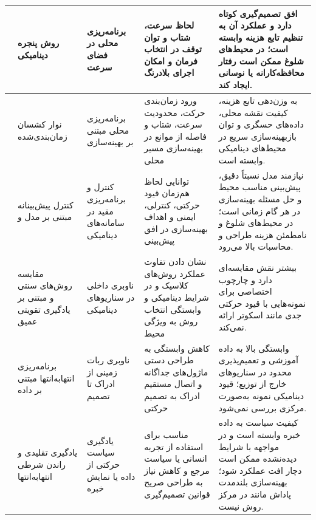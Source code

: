 \begin{longtable}{|C{2.35cm}|P{2.35cm}|P{2.65cm}|P{3.45cm}|P{3.95cm}|}
	\cite{fox1997dwa} &
	روش پنجره دینامیکی  &
	برنامه‌ریزی محلی در فضای سرعت &
	لحاظ سرعت، شتاب و توان توقف در انتخاب فرمان و امکان اجرای بلادرنگ &
	افق تصمیم‌گیری کوتاه دارد و عملکرد آن به تنظیم تابع هزینه وابسته است؛ در محیط‌های شلوغ ممکن است رفتار محافظه‌کارانه یا نوسانی ایجاد کند. \\
	\hline
	
	\cite{Quinlan1993ElasticBands,Rosmann2013TEB,Rosmann2015TEB} &
	نوار کشسان زمان‌بندی‌شده  &
	برنامه‌ریزی محلی مبتنی بر بهینه‌سازی &
	ورود زمان‌بندی حرکت، محدودیت سرعت، شتاب و فاصله از موانع در بهینه‌سازی مسیر محلی &
	به وزن‌دهی تابع هزینه، کیفیت نقشه محلی، داده‌های حسگری و توان بازبهینه‌سازی سریع در محیط‌های دینامیکی وابسته است. \\
	\hline
	
	\cite{rawlings2009mpc,Bemporad1999,Mayne2005TubeMPC} &
	کنترل پیش‌بینانه مبتنی بر مدل  و  &
	کنترل و برنامه‌ریزی مقید در سامانه‌های دینامیکی &
	توانایی لحاظ هم‌زمان قیود حرکتی، کنترلی، ایمنی و اهداف بهینه‌سازی در افق پیش‌بینی &
	نیازمند مدل نسبتاً دقیق، پیش‌بینی مناسب محیط و حل مسئله بهینه‌سازی در هر گام زمانی است؛ در محیط‌های شلوغ و نامطمئن هزینه طراحی و محاسبات بالا می‌رود. \\
	\hline
	
	\cite{s23249672} &
	مقایسه روش‌های سنتی و مبتنی بر یادگیری تقویتی عمیق &
	ناوبری داخلی در سناریوهای دینامیکی &
	نشان دادن تفاوت عملکرد روش‌های کلاسیک و  در شرایط دینامیکی و وابستگی انتخاب روش به ویژگی محیط &
	بیشتر نقش مقایسه‌ای دارد و چارچوب اختصاصی برای نمونه‌هایی با قیود حرکتی جدی مانند اسکوتر ارائه نمی‌کند. \\
	\hline
	
	\cite{pfeiffer2018nav} &
	برنامه‌ریزی انتهابه‌انتها مبتنی بر داده &
	ناوبری ربات زمینی از ادراک تا تصمیم &
	کاهش وابستگی به طراحی دستی ماژول‌های جداگانه و اتصال مستقیم ادراک به تصمیم حرکتی &
	وابستگی بالا به داده آموزشی و تعمیم‌پذیری محدود در سناریوهای خارج از توزیع؛ قیود دینامیکی نمونه به‌صورت مرکزی بررسی نمی‌شود. \\
	\hline
	
	\cite{argall2009survey,codevilla2018endtoend} &
	یادگیری تقلیدی و راندن شرطی انتهابه‌انتها &
	یادگیری سیاست حرکتی از داده یا نمایش خبره &
	مناسب برای استفاده از تجربه انسانی یا سیاست مرجع و کاهش نیاز به طراحی صریح قوانین تصمیم‌گیری &
	کیفیت سیاست به داده خبره وابسته است و در مواجهه با شرایط دیده‌نشده ممکن است دچار افت عملکرد شود؛ بهینه‌سازی بلندمدت پاداش مانند  در مرکز روش نیست. \\
	\hline
	

\end{longtable}
